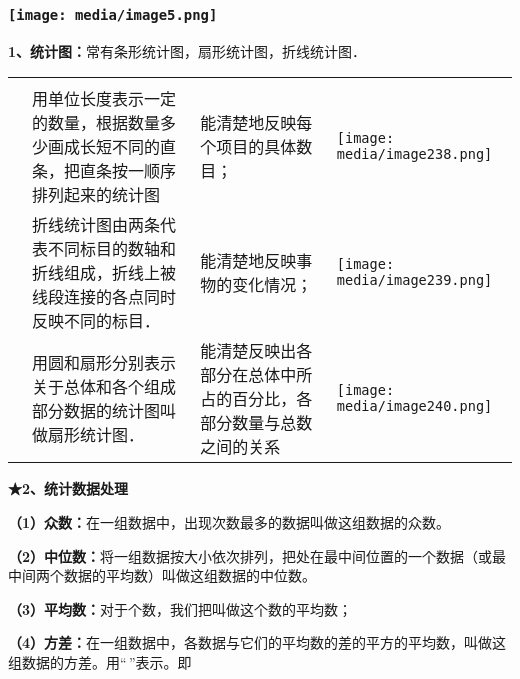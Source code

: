 \documentclass[a4paper,11pt,UTF8]{ctexart}
\begin{document}
\hypertarget{ux5b66ux79d1ux7f51www.zxxk.com--ux6559ux80b2ux8d44ux6e90ux95e8ux6237ux63d0ux4f9bux8bd5ux9898ux8bd5ux5377ux6559ux6848ux8bfeux4ef6ux6559ux5b66ux8bbaux6587ux7d20ux6750ux7b49ux5404ux7c7bux6559ux5b66ux8d44ux6e90ux5e93ux4e0bux8f7dux8fd8ux6709ux5927ux91cfux4e30ux5bccux7684ux6559ux5b66ux8d44ux8baf-43}{%
\subsubsection{\texorpdfstring{\protect\texttt{[image: media/image5.png]}}{学科网(www.zxxk.com)-\/-教育资源门户，提供试题试卷、教案、课件、教学论文、素材等各类教学资源库下载，还有大量丰富的教学资讯！}}\label{ux5b66ux79d1ux7f51www.zxxk.com--ux6559ux80b2ux8d44ux6e90ux95e8ux6237ux63d0ux4f9bux8bd5ux9898ux8bd5ux5377ux6559ux6848ux8bfeux4ef6ux6559ux5b66ux8bbaux6587ux7d20ux6750ux7b49ux5404ux7c7bux6559ux5b66ux8d44ux6e90ux5e93ux4e0bux8f7dux8fd8ux6709ux5927ux91cfux4e30ux5bccux7684ux6559ux5b66ux8d44ux8baf-43}}

\textbf{1、统计图：}常有条形统计图，扇形统计图，折线统计图．

\begin{longtable}[]{@{}llll@{}}
\toprule
\endhead
& & &\tabularnewline
&
用单位长度表示一定的数量，根据数量多少画成长短不同的直条，把直条按一顺序排列起来的统计图
& 能清楚地反映每个项目的具体数目； &
\texttt{[image: media/image238.png]}\tabularnewline
&
折线统计图由两条代表不同标目的数轴和折线组成，折线上被线段连接的各点同时反映不同的标目．
& 能清楚地反映事物的变化情况； &
\texttt{[image: media/image239.png]}\tabularnewline
& 用圆和扇形分别表示关于总体和各个组成部分数据的统计图叫做扇形统计图． &
能清楚反映出各部分在总体中所占的百分比，各部分数量与总数之间的关系 &
\texttt{[image: media/image240.png]}\tabularnewline
\bottomrule
\end{longtable}

\textbf{★2、统计数据处理}

\textbf{（1）众数：}在一组数据中，出现次数最多的数据叫做这组数据的众数。

\textbf{（2）中位数：}将一组数据按大小依次排列，把处在最中间位置的一个数据（或最中间两个数据的平均数）叫做这组数据的中位数。

\textbf{（3）平均数：}对于个数，我们把叫做这个数的平均数；

\textbf{（4）方差：}在一组数据中，各数据与它们的平均数的差的平方的平均数，叫做这组数据的方差。用``\,''表示。即
\end{document}
